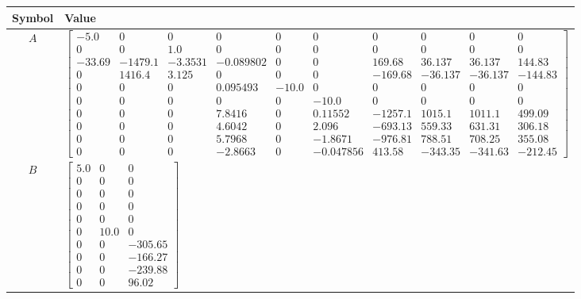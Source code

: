 \begin{tabular}{cl}
\hline
  Symbol  & Value                                                                                                                                                                                                                                                                                                                                                                                                                                                                                                                                                                                                                                                                              \\
\hline
   $A$    & $\left[\begin{matrix}-5.0 & 0 & 0 & 0 & 0 & 0 & 0 & 0 & 0 & 0\\0 & 0 & 1.0 & 0 & 0 & 0 & 0 & 0 & 0 & 0\\-33.69 & -1479.1 & -3.3531 & -0.089802 & 0 & 0 & 169.68 & 36.137 & 36.137 & 144.83\\0 & 1416.4 & 3.125 & 0 & 0 & 0 & -169.68 & -36.137 & -36.137 & -144.83\\0 & 0 & 0 & 0.095493 & -10.0 & 0 & 0 & 0 & 0 & 0\\0 & 0 & 0 & 0 & 0 & -10.0 & 0 & 0 & 0 & 0\\0 & 0 & 0 & 7.8416 & 0 & 0.11552 & -1257.1 & 1015.1 & 1011.1 & 499.09\\0 & 0 & 0 & 4.6042 & 0 & 2.096 & -693.13 & 559.33 & 631.31 & 306.18\\0 & 0 & 0 & 5.7968 & 0 & -1.8671 & -976.81 & 788.51 & 708.25 & 355.08\\0 & 0 & 0 & -2.8663 & 0 & -0.047856 & 413.58 & -343.35 & -341.63 & -212.45\end{matrix}\right]$ \\
   $B$    & $\left[\begin{matrix}5.0 & 0 & 0\\0 & 0 & 0\\0 & 0 & 0\\0 & 0 & 0\\0 & 0 & 0\\0 & 10.0 & 0\\0 & 0 & -305.65\\0 & 0 & -166.27\\0 & 0 & -239.88\\0 & 0 & 96.02\end{matrix}\right]$                                                                                                                                                                                                                                                                                                                                                                                                                                                                                                   \\

\end{tabular}
